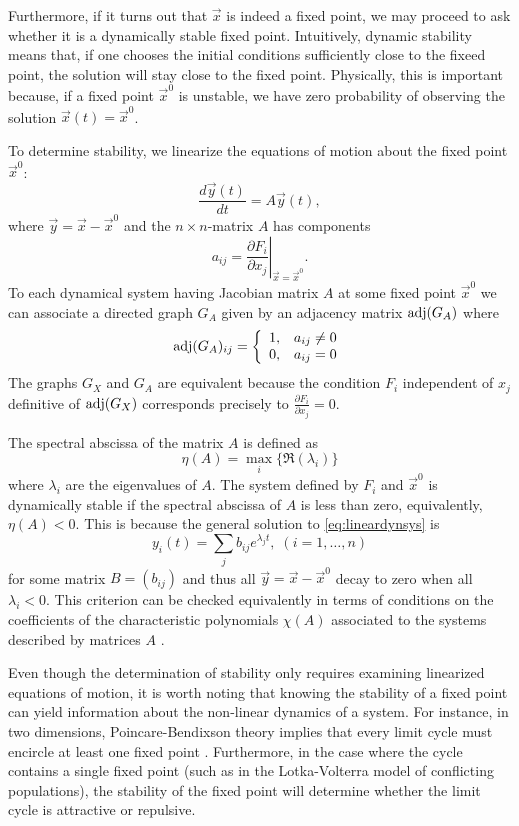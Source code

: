 Furthermore, if it turns out that $\vec x$ is indeed a fixed point, we
may proceed to ask whether it is a dynamically stable fixed point.
Intuitively, dynamic stability means that, if one chooses the initial
conditions sufficiently close to the fixeed point, the solution will
stay close to the fixed point.  Physically, this is important because,
if a fixed point ${\vec x}^0$ is unstable, we have zero probability of
observing the solution ${\vec x}(t) = {\vec x}^0$.

To determine stability, we linearize the equations of motion about the
fixed point $\vec{x}^0$:
\begin{equation}\label{eq:lineardynsys}
\frac{d\vec{y}(t)}{dt} = A \vec{y}(t),
\end{equation}
where $\vec{y} = \vec{x} - \vec{x}^0$ and the $n \times n$-matrix $A$ has components
$$
a_{ij} = \left. \frac{\partial F_i}{\partial x_j} \right|_{\vec{x} = \vec{x}^0}.
$$
To each dynamical system having Jacobian matrix $A$ at some fixed point $\vec{x}^0$ we can associate a directed graph $G_A$ given by an adjacency matrix $\mathrm{adj}(G_A)$ where
 \begin{displaymath}
   \mathrm{adj}(G_A)_{ij} = \left\{
     \begin{array}{lr}
       1, & a_{ij} \neq 0\\
       0, & a_{ij} = 0
     \end{array}
   \right.
\end{displaymath}
The graphs $G_X$ and $G_A$ are equivalent because the condition $F_i$ independent of $x_j$ definitive of $\mathrm{adj}(G_X)$ corresponds precisely to $\frac{\partial F_i}{\partial x_j}=0$.

The spectral abscissa of the matrix $A$ is defined as
$$
\eta(A) = \max_i \{\Re(\lambda_i)\}
$$
where $\lambda_i$ are the eigenvalues of $A$. The system defined by $F_i$ and $\vec{x}^0$ is dynamically stable if the spectral abscissa of $A$ is less than zero, equivalently, $\eta(A) < 0$. This is because the general solution to \ref{eq:lineardynsys} is
$$
y_i(t) = \sum_j b_{ij} e^{\lambda_j t}, \; (i=1,\ldots,n)
$$
for some matrix $B=(b_{ij})$ and thus all $\vec{y} = \vec{x} - \vec{x}^0$ decay to zero when all $\lambda_i < 0$. This criterion can be checked equivalently in terms of conditions on the coefficients of the characteristic polynomials $\chi(A)$ associated to the systems described by matrices $A$ \cite{Gantmacher1959}.

Even though the determination of stability only requires examining
linearized equations of motion, it is worth noting that knowing the
stability of a fixed point can yield information about the non-linear
dynamics of a system.  For instance, in two dimensions,
Poincare-Bendixson theory implies that every limit cycle must encircle
at least one fixed point \cite{Davis1962}.  Furthermore, in the case where the cycle contains a single fixed point (such as in the Lotka-Volterra model of
conflicting populations), the stability of the fixed point will determine whether the limit cycle is attractive or repulsive.

